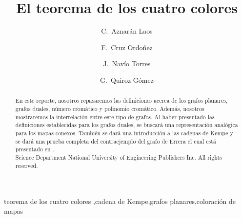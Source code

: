 \documentclass[3p,times,a4paper,twocolumn,authoryear]{elsarticle} %
\begin{document}
\begin{frontmatter}

\title{El teorema de los cuatro colores}

\author[1,3]{C.~Aznarán Laos}

\author[1,3]{F.~Cruz Ordoñez}

\author[2,3]{J.~Navío Torres}

\author[1,3]{G.~Quiroz Gómez}

\address[1]{Facultad de Ciencias - Escuela profesional de Ciencia de la Computación}
\address[2]{Facultad de Ciencias - Escuela profesional de Matemática}
\address[3]{Universidad Nacional de Ingeniería,	Av. Túpac Amaru 210, Rímac, Lima 25, Perú}
%
\begin{abstract}
En este reporte, nosotros repasaremos las definiciones acerca de los grafos planares, grafos duales, número cromático y polinomio cromático. Además, nosotros mostraremos la interrelación entre este tipo de grafos. Al haber presentado las definiciones establecidas para los grafos duales, se buscará una representación analógica para los mapas conexos. También se dará una introducción a las cadenas de Kempe y se dará una prueba completa del contraejemplo del grafo de Errera el cual está presentado en \cite{birkhoff}.
\\[0.2cm]
\textcopyright \hspace{.1cm}Science Department National University of Engineering Publishers Inc. All rights reserved. 
\end{abstract}

\begin{keyword}
teorema de los cuatro colores \sep cadena de Kempe\sep grafos planares\sep coloración de mapas
\end{keyword}

\end{frontmatter}
\end{document}

